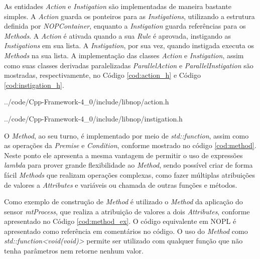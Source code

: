 As entidades \textit{Action} e \textit{Instigation} são implementadas de maneira
bastante simples. A \textit{Action} guarda os ponteiros para as
\textit{Instigations}, utilizando a estrutura definida por
\textit{NOPContainer}, enquanto a \textit{Instigation} guarda referências para
os \textit{Methods}. A \textit{Action} é ativada quando a sua \textit{Rule} é
aprovada, instigando as \textit{Instigations} em sua lista. A
\textit{Instigation}, por sua vez, quando instigada executa os \textit{Methods}
na sua lista. A implementação das classes \textit{Action} e
\textit{Instigation}, assim como suas classes derivadas paralelizadas
\textit{ParallelAction} e \textit{ParallelInstigation} são mostradas,
respectivamente, no Código \ref{cod:action_h} e Código \ref{cod:instigation_h}.


            {../code/Cpp-Framework-4_0/include/libnop/action.h}


            {../code/Cpp-Framework-4_0/include/libnop/instigation.h}

O \textit{Method}, ao seu turno, é implementado por meio de
\textit{std::function}, assim como as operações da \textit{Premise} e
\textit{Condition}, conforme mostrado no código \ref{cod:method}. Neste ponto
ele apresenta a mesma vantagem de permitir o uso de expressões \textit{lambda}
para prover grande flexibilidade ao \textit{Method}, sendo possível criar de
forma fácil \textit{Methods} que realizam operações complexas, como fazer
múltiplas atribuições de valores a \textit{Attributes} e variáveis ou chamada de
outras funções e métodos. 

Como exemplo de construção de \textit{Method} é utilizado o \textit{Method} da
aplicação do sensor \textit{mtProcess}, que realiza a atribuição de valores a
dois \textit{Attributes}, conforme apresentado no Código \ref{cod:method_ex}.
O código equivalente em NOPL é apresentado como referência em comentários no
código. O uso do \textit{Method} como \textit{std::function<void(void)>} permite
ser utilizado com qualquer função que não tenha parâmetros nem retorne nenhum
valor.


